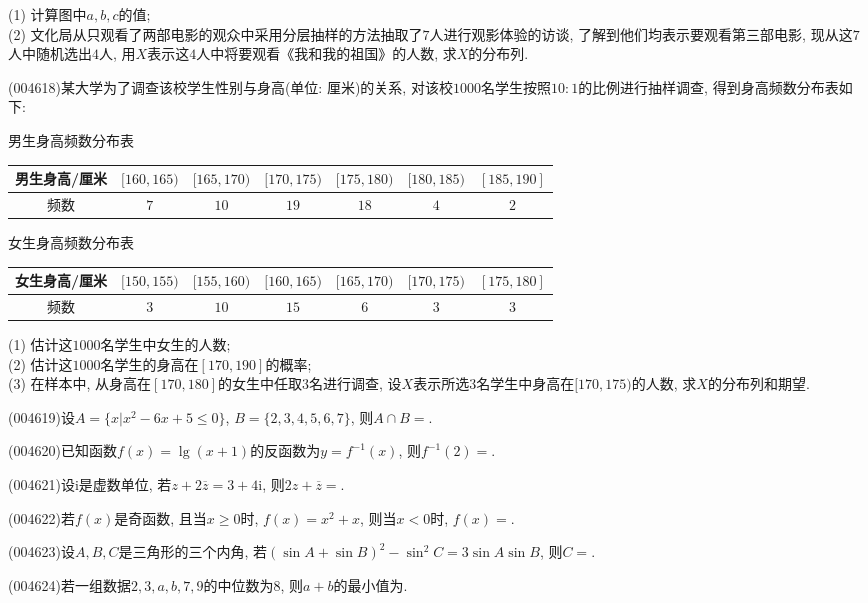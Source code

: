 (1) 计算图中$a, b, c$的值;\\
(2) 文化局从只观看了两部电影的观众中采用分层抽样的方法抽取了$7$人进行观影体验的访谈, 了解到他们均表示要观看第三部电影, 现从这$7$人中随机选出$4$人, 用$X$表示这$4$人中将要观看《我和我的祖国》的人数, 求$X$的分布列.
\item (004618)某大学为了调查该校学生性别与身高(单位: 厘米)的关系, 对该校$1000$名学生按照$10:1$的比例进行抽样调查, 得到身高频数分布表如下:
\begin{center}
男生身高频数分布表
    \begin{tabular}{|c|c|c|c|c|c|c|}
        \hline 
        男生身高/厘米 & $[160,165)$ & $[165,170)$ & $[170,175)$ & $[175,180)$ & $[180,185)$ & $[185,190]$\\ \hline
        频数 & $7$ & $10$ & $19$ & $18$	& $4$ & $2$\\ \hline
    \end{tabular}
\end{center}
\begin{center}
    女生身高频数分布表
    \begin{tabular}{|c|c|c|c|c|c|c|}
        \hline 
        女生身高/厘米 &  $[150,155)$ & $[155,160)$ & $[160,165)$ & $[165,170)$ & $[170,175)$ & $[175,180]$ \\ \hline
        频数 & $3$ & $10$ & $15$ & $6$	& $3$ & $3$\\ \hline
    \end{tabular}
 \end{center}
(1) 估计这$1000$名学生中女生的人数;\\
(2) 估计这$1000$名学生的身高在$[170, 190]$的概率;\\
(3) 在样本中, 从身高在$[170, 180]$的女生中任取$3$名进行调查, 设$X$表示所选$3$名学生中身高在$[170, 175)$的人数, 求$X$的分布列和期望.
\item (004619)设$A=\{x|x^2-6x+5\le 0\}$, $B=\{2,3,4,5,6,7\}$, 则$A\cap B=$.
\item (004620)已知函数$f(x)=\lg (x+1)$的反函数为$y=f^{-1}(x)$, 则$f^{-1}(2)=$.
\item (004621)设$\mathrm{i}$是虚数单位, 若$z+2\overline z=3+4\mathrm{i}$, 则$2z+\overline z=$.
\item (004622)若$f(x)$是奇函数, 且当$x\ge 0$时, $f(x)=x^2+x$, 则当$x<0$时, $f(x)=$.
\item (004623)设$A,B,C$是三角形的三个内角, 若$(\sin A+\sin B)^2-{{\sin }^2}C=3\sin A\sin B$, 则$C=$.
\item (004624)若一组数据$2,3,a,b,7,9$的中位数为$8$, 则$a+b$的最小值为.
